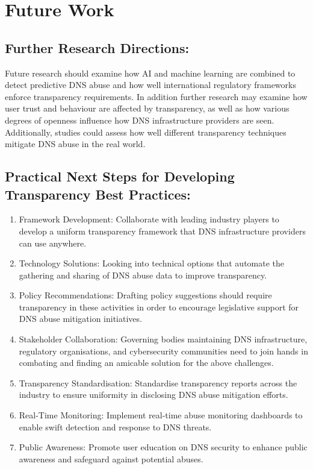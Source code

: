 \section{Future Work}



\subsection{Further Research Directions:} Future research should examine how AI and machine learning are combined to detect predictive DNS abuse and how well international regulatory frameworks enforce transparency requirements. In addition further research may examine how user trust and behaviour are affected by transparency, as well as how various degrees of openness influence how DNS infrastructure providers are seen. Additionally, studies could assess how well different transparency techniques mitigate DNS abuse in the real world.

\subsection{Practical Next Steps for Developing Transparency Best Practices: }

\begin{enumerate}
    \item Framework Development: Collaborate with leading industry players to develop a uniform transparency framework that DNS infrastructure providers can use anywhere.

    \item Technology Solutions: Looking into technical options that automate the gathering and sharing of DNS abuse data to improve transparency.

    \item Policy Recommendations: Drafting policy suggestions should require transparency in these activities in order to encourage legislative support for DNS abuse mitigation initiatives.
    
    \item Stakeholder Collaboration: Governing bodies maintaining DNS infrastructure, regulatory organisations, and cybersecurity communities need to join hands in combating and finding an amicable solution for the above challenges.
    
    \item Transparency Standardisation:  Standardise transparency reports across the industry to ensure uniformity in disclosing DNS abuse mitigation efforts.
    \item Real-Time Monitoring: Implement real-time abuse monitoring dashboards to enable swift detection and response to DNS threats.
    \item  Public Awareness: Promote user education on DNS security to enhance public awareness and safeguard against potential abuses.
\end{enumerate}


